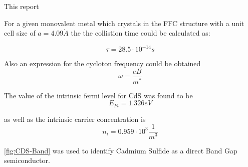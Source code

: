 


This report 


For a given monovalent metal which crystals in the FFC structure
with a unit cell size of  $a = 4.09 \mathring{A}$ the the collistion
time could be calculated as:

$$\tau = 28.5 \cdot 10^{-14}s$$

Also an expression for the cycloton frequency could be obtained
$$\omega = \frac{eB}{m^*}$$


The value of the intrinsic fermi level for CdS was found to be
$$E_{Fi} = 1.326 eV$$

as well as the intrinsic carrier concentration is
$$n_i = 0.959 \cdot 10^3 \frac{1}{m^3}$$

\autoref{fig:CDS-Band} was used to identify Cadmium Sulfide
as a direct Band Gap semiconductor.
